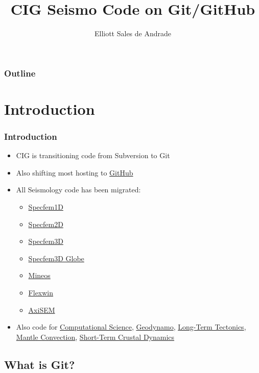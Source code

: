 \documentclass{beamer}
\author{Elliott Sales de Andrade}
\title{CIG Seismo Code on Git/GitHub}
\institute{University of Toronto}
\begin{document}
\begin{frame}
 \titlepage
\end{frame}

\begin{frame}
 \frametitle{Outline}
 \tableofcontents
\end{frame}

\section{Introduction}

\begin{frame}
 \frametitle{Introduction}

 \begin{itemize}
  \item CIG is transitioning code from Subversion to Git
  \item Also shifting most hosting to \href{https://github.com/}{GitHub}
  \item All Seismology code has been migrated:
   \begin{itemize}
    \item \href{https://github.com/geodynamics/specfem1d}{Specfem1D}
    \item \href{https://github.com/geodynamics/specfem2d}{Specfem2D}
    \item \href{https://github.com/geodynamics/specfem3d}{Specfem3D}
    \item \href{https://github.com/geodynamics/specfem3d_globe}{Specfem3D Globe}
    \item \href{https://github.com/geodynamics/mineos}{Mineos}
    \item \href{https://github.com/geodynamics/flexwin}{Flexwin}
    \item \href{https://github.com/geodynamics/axisem}{AxiSEM}
   \end{itemize}
  \item Also code for
        \href{http://geodynamics.org/cig/software/\#cs}{Computational Science},
        \href{http://geodynamics.org/cig/software/\#geodyn}{Geodynamo},
        \href{http://geodynamics.org/cig/software/\#long}{Long-Term Tectonics},
        \href{http://geodynamics.org/cig/software/\#mc}{Mantle Convection},
        \href{http://geodynamics.org/cig/software/\#short}{Short-Term Crustal
        Dynamics}
 \end{itemize}
\end{frame}

\subsection{What is Git?}
\end{document}
